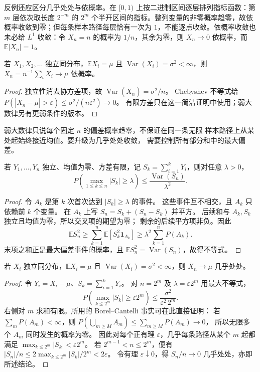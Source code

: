 反例还应区分几乎处处与依概率。在 \([0,1)\) 上按二进制区间逐层排列指标函数：第 \(m\) 层依次取长度 \(2^{-m}\) 的 \(2^m\) 个半开区间的指标。整列变量的非零概率趋零，故依概率收敛到零；但每条样本路径每层恰有一次为 \(1\)，不能逐点收敛。依概率收敛也未必给 \(L^1\) 收敛：令 \(X_n=n\) 的概率为 \(1/n\)，其余为零，则 \(X_n\to0\) 依概率，而 \(\mathbb E|X_n|=1\)。

\begin{theorem}
若 \(X_1,X_2,\ldots\) 独立同分布，\(\mathbb E X_i=\mu\) 且
\(\operatorname{Var}(X_i)=\sigma^2<\infty\)，则
\(\overline X_n=n^{-1}\sum_iX_i\to\mu\) 依概率。
\end{theorem}
\begin{proof}
独立性消去协方差项，故
\(\operatorname{Var}(\overline X_n)=\sigma^2/n\)。
Chebyshev 不等式给
\(P(|\overline X_n-\mu|>\varepsilon)\le\sigma^2/(n\varepsilon^2)\to0\)。
有限方差只在这一简洁证明中使用；弱大数律另有更弱条件的版本。
\end{proof}

弱大数律只说每个固定 \(n\) 的偏差概率趋零，不保证在同一条无限
样本路径上从某处起始终接近均值。要升级为几乎处处收敛，
需要控制所有部分和中的最大偏差。

\begin{proposition}
若 \(Y_1,\ldots,Y_n\) 独立、均值为零、方差有限，记
\(S_k=\sum_{i=1}^kY_i\)，则对任意 \(\lambda>0\)，
\[
P\!\left(\max_{1\le k\le n}|S_k|\ge\lambda\right)
\le\frac{\operatorname{Var}(S_n)}{\lambda^2}.
\]
\end{proposition}
\begin{proof}
令 \(A_k\) 是第 \(k\) 次首次达到 \(|S_k|\ge\lambda\) 的事件。
这些事件互不相交，且 \(A_k\) 只依赖前 \(k\) 个变量。
在 \(A_k\) 上写 \(S_n=S_k+(S_n-S_k)\) 并平方。
后续和与 \(A_k,S_k\) 独立且均值为零，所以交叉项的期望为零；
剩余的后续平方项非负。因此
\[
\mathbb E S_n^2
\ge\sum_{k=1}^n\mathbb E[S_k^2\mathbf1_{A_k}]
\ge\lambda^2\sum_{k=1}^nP(A_k).
\]
末项之和正是最大偏差事件的概率，且
\(\mathbb E S_n^2=\operatorname{Var}(S_n)\)，故得不等式。
\end{proof}

\begin{theorem}
若 \(X_i\) 独立同分布，\(\mathbb E X_i=\mu\) 且
\(\operatorname{Var}(X_i)=\sigma^2<\infty\)，则
\(\overline X_n\to\mu\) 几乎处处。
\end{theorem}
\begin{proof}
令 \(Y_i=X_i-\mu\)、\(S_k=\sum_{i=1}^kY_i\)。
对 \(n=2^m\) 及 \(\lambda=\varepsilon2^m\) 用最大不等式，
\[
P\!\left(\max_{k\le2^m}|S_k|\ge\varepsilon2^m\right)
\le\frac{\sigma^2}{\varepsilon^2\,2^m}.
\]
右侧对 \(m\) 求和有限。所用的 Borel--Cantelli 事实可在此直接证明：
若 \(\sum_mP(A_m)<\infty\)，则
\(P(\bigcup_{m\ge M}A_m)\le\sum_{m\ge M}P(A_m)\to0\)，
所以无限多个 \(A_m\) 同时发生的概率为零。
因此对每个正有理 \(\varepsilon\)，几乎每条路径从某个
\(m\) 起都满足
\(\max_{k\le2^m}|S_k|<\varepsilon2^m\)。
若 \(2^{m-1}<n\le2^m\)，便有
\(|S_n|/n\le2\max_{k\le2^m}|S_k|/2^m<2\varepsilon\)。
令有理 \(\varepsilon\downarrow0\)，得 \(S_n/n\to0\)
几乎处处，亦即所述结论。
\end{proof}


